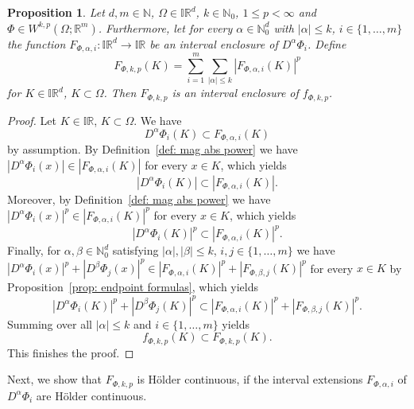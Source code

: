 \documentclass[a4paper, 11pt]{article}
\newtheorem{proposition}[theorem]{Proposition}
\begin{document}
	\begin{proposition}\label{prop: lebesgue sobolev interval enclosure}
		Let $d,m\in \mathbb{N}$, $\Omega \in \mathbb{IR}^d$, $k\in \mathbb{N}_0$, $1\leq p < \infty$ and $\Phi \in W^{k,p}(\Omega;\mathbb{R}^m)$. Furthermore, let for every $\alpha \in \mathbb{N}^d_0$ with $|\alpha|\leq k$, $i\in\{1,\dotsc, m\}$ the function $F_{\Phi,\alpha,i}: \mathbb{IR}^d  \to \mathbb{IR}$ be an interval enclosure of $D^\alpha\Phi_i$. Define
		\begin{equation}
			F_{\Phi,k,p}(K) = \sum_{i=1}^m\sum_{|\alpha|\leq k} |F_{\Phi,\alpha, i}(K)|^p
		\end{equation}
		for $K\in\mathbb{IR}^d$, $K\subset \Omega$. Then $ F_{\Phi,k,p}$ is an interval enclosure of $f_{\Phi,k,p}$.
	\end{proposition}
	\begin{proof}
		Let $K\in \mathbb{IR}$, $K \subset \Omega$. We have 
		$$ D^\alpha\Phi_i(K) \subset F_{\Phi,\alpha, i}(K) $$
		by assumption.
		By Definition~\ref{def: mag abs power} we have
		$ |D^\alpha\Phi_i(x)| \in |F_{\Phi,\alpha, i}(K)|$
		for every $x\in K$, which yields
		$$ |D^\alpha\Phi_i(K)| \subset |F_{\Phi,\alpha, i}(K)|. $$
		Moreover,  by Definition~\ref{def: mag abs power} we have
		$ |D^\alpha\Phi_i(x)|^p \in |F_{\Phi,\alpha, i}(K)|^p$
		for every $x\in K$, which yields
		$$ |D^\alpha\Phi_i(K)|^p \subset |F_{\Phi,\alpha, i}(K)|^p. $$
		Finally, for $\alpha,\beta \in \mathbb{N}_0^d$ satisfying $|\alpha|,|\beta|\leq k$, $i,j\in\{1,\dotsc, m\}$ we have
		$ |D^\alpha\Phi_i(x)|^p + |D^\beta\Phi_j(x)|^p \in |F_{\Phi,\alpha, i}(K)|^p + |F_{\Phi,\beta,j}(K)|^p$
		for every $x\in K$ by Proposition~\ref{prop: endpoint formulas}, which yields
		$$ |D^\alpha\Phi_i(K)|^p + |D^\beta\Phi_j(K)|^p \subset |F_{\Phi,\alpha, i}(K)|^p + |F_{\Phi,\beta,j}(K)|^p. $$
		Summing over all $|\alpha|\leq k$ and $i\in\{1,\dotsc,m\}$ yields
		$$ f_{\Phi,k,p}(K) \subset F_{\Phi,k,p}(K). $$
		This finishes the proof.
	\end{proof}
	
	Next, we show that $F_{\Phi,k,p}$ is Hölder continuous, if the interval extensions $F_{\Phi,\alpha,i}$ of $D^\alpha \Phi_i$ are Hölder continuous.
	
\end{document}
